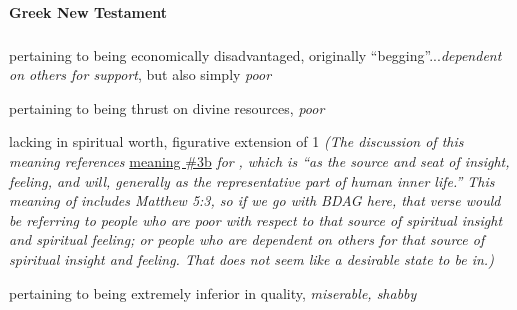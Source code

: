 	
			
	
			
			
		\paragraph{Greek New Testament} %
			\label{POOR-GREEK}
		
			\subparagraph{\texorpdfstring{}{}}
				\label{PTOCHOS}
			
				\begin{compactdesc}
					\item[BDAG 795a] \textbf{}
						\begin{compactitem}
							\item[1] pertaining to being economically disadvantaged, originally ``begging''...\textit{dependent on others for support}, but also simply \textit{poor}
							\item[2] pertaining to being thrust on divine resources, \textit{poor}
							\item[3] lacking in spiritual worth, figurative extension of 1 \textit{(The discussion of this meaning references} \hyperref[PNEUMA]{meaning \#3b} \textit{for} \textit{, which is ``as the source and seat of insight, feeling, and will, generally as the representative part of human inner life.'' This meaning of}  \textit{includes Matthew 5:3, so if we go with BDAG here, that verse would be referring to people who are poor with respect to that source of spiritual insight and spiritual feeling; or people who are dependent on others for that source of spiritual insight and feeling. That does not seem like a desirable state to be in.)}
							\item[4] pertaining to being extremely inferior in quality, \textit{miserable, shabby}
						\end{compactitem}
					\item[LSJ , PDF ] \textbf{}
						\begin{compactitem}
							\item 
						\end{compactitem}
				\end{compactdesc}
				
